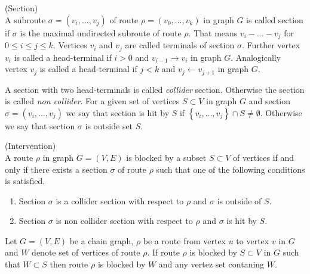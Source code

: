 \begin{defi} (Section) \\
	A subroute $\sigma = (v_i, \dots, v_j)$ of route $\rho = (v_0, \dots, v_k)$ in graph $G$ is called section if $			\sigma$ is the maximal undirected subroute of route $\rho$. That means $v_i - \dots - v_j$ for $0 \le i \le j 			\le k$. Vertices $v_i$ and $v_j$ are called terminals of section $\sigma$. Further vertex $v_i$ is called a 			head-terminal if $i>0$ and $v_{i-1} \rightarrow v_i$ in graph $G$. Analogically vertex $v_j$ is called 
	a head-terminal if $j<k$ and $v_j \leftarrow v_{j+1}$ in graph $G$.
\end{defi}


A section with two head-terminals is called \textit{collider} section. Otherwise the section is called 
\textit{non collider}. For a given set of vertices $S \subset V$ in graph $G$ and section $\sigma = (v_i, \dots, v_j)$ we say that section is hit by $S$ if $\left\lbrace v_i , \dots, v_j \right\rbrace \cap S \neq \emptyset$. Otherwise we say that section $\sigma$ is outside set $S$.



\begin{defi} (Intervention) \\
	A route $\rho$ in graph $G = (V, E)$ is blocked by a subset $S \subset V$ of vertices if and only if there 				exists a section $\sigma$ of route $\rho$ such that one of the following conditions is satisfied.
	
	\begin{enumerate}
		\item Section $\sigma$ is a collider section with respect to $\rho$ and $\sigma$ is outside of $S$.
		\item Section $\sigma$ is non collider section with respect to $\rho$ and $\sigma$ is hit by $S$.
	\end{enumerate}
	
\end{defi}




\begin{lemma} \label{lemma1}
	Let $G = (V, E)$ be a chain graph, $\rho$ be a route from vertex $u$ to vertex $v$ in $G$ and $W$ denote set of vertices of route $\rho$.
	If route $\rho$ is blocked by $S \subset V$ in $G$ such that $W \subset S$ then route $\rho$ is blocked by $W$ and any vertez set contaning $W$. 
\end{lemma}

